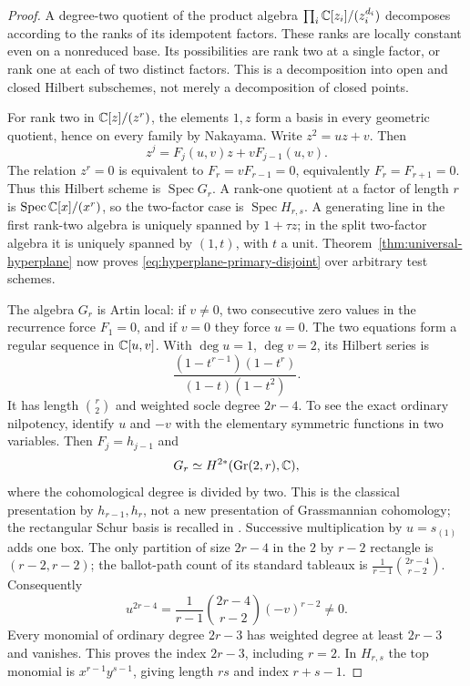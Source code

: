 \begin{proof}
A degree-two quotient of the product algebra
$\prod_i\mathbb C[z_i]/(z_i^{d_i})$ decomposes according to the ranks of its
idempotent factors. These ranks are locally constant even on a
nonreduced base. Its possibilities are rank two at a single factor,
or rank one at each of two distinct factors. This is a decomposition
into open and closed Hilbert subschemes, not merely a decomposition
of closed points.

For rank two in $\mathbb C[z]/(z^r)$, the elements $1,z$ form a basis in
every geometric quotient, hence on every family by Nakayama. Write
$z^2=uz+v$. Then
\[
 z^j=F_j(u,v)z+vF_{j-1}(u,v).
\]
The relation $z^r=0$ is equivalent to
$F_r=vF_{r-1}=0$, equivalently $F_r=F_{r+1}=0$. Thus this Hilbert
scheme is $\operatorname{Spec}G_r$. A rank-one quotient at a factor
of length $r$ is $\operatorname{Spec}\mathbb C[x]/(x^r)$, so the two-factor
case is $\operatorname{Spec}H_{r,s}$. A generating line in the first
rank-two algebra is uniquely spanned by $1+\tau z$; in the split
two-factor algebra it is uniquely spanned by $(1,t)$, with $t$ a
unit. Theorem~\ref{thm:universal-hyperplane} now proves
\eqref{eq:hyperplane-primary-disjoint} over arbitrary test schemes.

The algebra $G_r$ is Artin local: if $v\ne0$, two consecutive zero
values in the recurrence force $F_1=0$, and if $v=0$ they force
$u=0$. The two equations form a regular sequence in $\mathbb C[u,v]$.
With $\deg u=1$, $\deg v=2$, its Hilbert series is
\begin{equation}\label{eq:grass-hilbert}
 \frac{(1-t^{r-1})(1-t^r)}{(1-t)(1-t^2)}.
\end{equation}
It has length $\binom r2$ and weighted socle degree $2r-4$.
To see the exact ordinary nilpotency, identify $u$ and $-v$ with
the elementary symmetric functions in two variables. Then
$F_j=h_{j-1}$ and
\begin{equation}\label{eq:grass-ring}
 G_r\simeq H^{2*}(\operatorname{Gr}(2,r),\mathbb C),
\end{equation}
where the cohomological degree is divided by two. This is the
classical presentation by $h_{r-1},h_r$, not a new presentation of
Grassmannian cohomology; the rectangular Schur basis is recalled in
\cite[Theorem 2.7 and the following discussion]{Grinberg}.
Successive multiplication by $u=s_{(1)}$ adds one box. The only
partition of size $2r-4$ in the $2$ by $r-2$ rectangle is
$(r-2,r-2)$; the ballot-path count of its standard tableaux is
$\frac1{r-1}\binom{2r-4}{r-2}$. Consequently
\[
 u^{2r-4}=\frac1{r-1}\binom{2r-4}{r-2}(-v)^{r-2}\ne0.
\]
Every monomial of ordinary degree $2r-3$ has weighted degree at
least $2r-3$ and vanishes. This proves the index $2r-3$, including
$r=2$. In $H_{r,s}$ the top monomial is $x^{r-1}y^{s-1}$, giving
length $rs$ and index $r+s-1$.


\end{proof}
